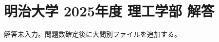 \documentclass[../../uem_mei_a.tex]{subfiles}
\begin{document}
    \section{明治大学 2025年度 理工学部 解答}

    解答未入力。問題数確定後に大問別ファイルを追加する。
\end{document}
